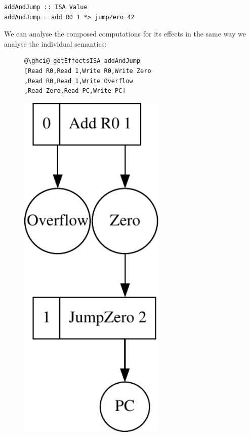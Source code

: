 \begin{verbatim}
addAndJump :: ISA Value
addAndJump = add R0 1 *> jumpZero 42
\end{verbatim}

We can analyse the composed computations for its effects in the same way we analyse the
individual semantics:

\begin{figure}[!h]
 \begin{minipage}{0.45\textwidth}
\raggedleft
\begin{verbatim}
@\ghci@ getEffectsISA addAndJump
[Read R0,Read 1,Write R0,Write Zero
,Read R0,Read 1,Write Overflow
,Read Zero,Read PC,Write PC]
\end{verbatim}
 \end{minipage}
 \begin{minipage}{0.45\textwidth}
  \centering
\includegraphics[width=7cm]{./img/ISA/addAndJump.pdf}
 \end{minipage}
\end{figure}


